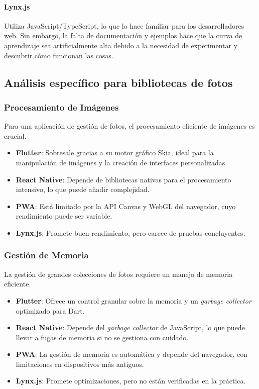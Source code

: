 \paragraph{Lynx.js}
Utiliza JavaScript/TypeScript, lo que lo hace familiar para los desarrolladores web. Sin embargo, la falta de documentación y ejemplos hace que la curva de aprendizaje sea artificialmente alta debido a la necesidad de experimentar y descubrir cómo funcionan las cosas.

\subsection{Análisis específico para bibliotecas de fotos}

\subsubsection{Procesamiento de Imágenes}
Para una aplicación de gestión de fotos, el procesamiento eficiente de imágenes es crucial.
\begin{itemize}
    \item \textbf{Flutter}: Sobresale gracias a su motor gráfico Skia, ideal para la manipulación de imágenes y la creación de interfaces personalizadas.
    \item \textbf{React Native}: Depende de bibliotecas nativas para el procesamiento intensivo, lo que puede añadir complejidad.
    \item \textbf{PWA}: Está limitado por la API Canvas y WebGL del navegador, cuyo rendimiento puede ser variable.
    \item \textbf{Lynx.js}: Promete buen rendimiento, pero carece de pruebas concluyentes.
\end{itemize}

\subsubsection{Gestión de Memoria}
La gestión de grandes colecciones de fotos requiere un manejo de memoria eficiente.
\begin{itemize}
    \item \textbf{Flutter}: Ofrece un control granular sobre la memoria y un \textit{garbage collector} optimizado para Dart.
    \item \textbf{React Native}: Depende del \textit{garbage collector} de JavaScript, lo que puede llevar a fugas de memoria si no se gestiona con cuidado.
    \item \textbf{PWA}: La gestión de memoria es automática y depende del navegador, con limitaciones en dispositivos más antiguos.
    \item \textbf{Lynx.js}: Promete optimizaciones, pero no están verificadas en la práctica.
\end{itemize}

